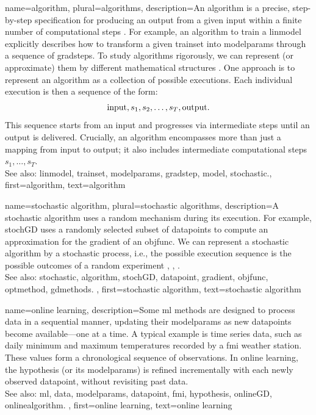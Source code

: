 {name={algorithm}, plural={algorithms},
 	description={An algorithm is a precise, step-by-step specification for 
  		producing an output from a given input within a finite number of computational steps \cite{Cormen:2022aa}. 
    		For example, an algorithm to train a \gls{linmodel} explicitly describes how to 
		transform a given \gls{trainset} into \gls{modelparams} through a sequence of \glspl{gradstep}. 
    		To study algorithms rigorously, we can represent (or approximate) them by different mathematical structures \cite{Sipser2013}. 
     		One approach is to represent an algorithm as a collection of possible executions. Each individual 
     		execution is then a sequence of the form: $${\rm input}, s_1, s_2, \ldots, s_T, {\rm output}.$$ This sequence 
     		starts from an input and progresses via intermediate steps until an output is delivered. Crucially, an algorithm 
     		encompasses more than just a mapping from input to output; it also includes intermediate computational 
     		steps $s_1, \ldots, s_T$.
				\\ 
		See also: \gls{linmodel}, \gls{trainset}, \gls{modelparams}, \gls{gradstep}, \gls{model}, \gls{stochastic}.},
	first={algorithm},
	text={algorithm} 
}

{name={stochastic algorithm}, 
 plural={stochastic algorithms},
	description={A \gls{stochastic} \gls{algorithm} uses a random mechanism 
		during its execution. For example, \gls{stochGD} uses a randomly selected subset of \glspl{datapoint} 
		to compute an approximation for the \gls{gradient} of an \gls{objfunc}. We can represent a 
		\gls{stochastic} \gls{algorithm} by a \gls{stochastic} process, i.e., the possible execution sequence is the possible outcomes of 
		a random experiment \cite{BertsekasProb}, \cite{RandomizedAlgos}, \cite{Gallager13}.		
		\\ 
		See also: \gls{stochastic}, \gls{algorithm}, \gls{stochGD}, \gls{datapoint}, \gls{gradient}, \gls{objfunc}, \gls{optmethod}, \gls{gdmethods}. },
	first={stochastic algorithm},
	text={stochastic algorithm} 
}

{name={online learning},
	description={Some \gls{ml} methods  are designed to process \gls{data} in a sequential 
		manner, updating their \gls{modelparams} as new \glspl{datapoint} become available—one at a time. 
		A typical example is time series data, such as daily \gls{minimum} and \gls{maximum} temperatures 
		recorded by a \gls{fmi} weather station. These values form a chronological sequence 
		of observations. In online learning, the \gls{hypothesis} (or its \gls{modelparams}) is refined 
		incrementally with each newly observed \gls{datapoint}, without revisiting past \gls{data}.  
		\\ 
		See also: \gls{ml}, \gls{data}, \gls{modelparams}, \gls{datapoint}, \gls{fmi}, \gls{hypothesis}, \gls{onlineGD}, \gls{onlinealgorithm}. },
	first={online learning},
	text={online learning} 
}

